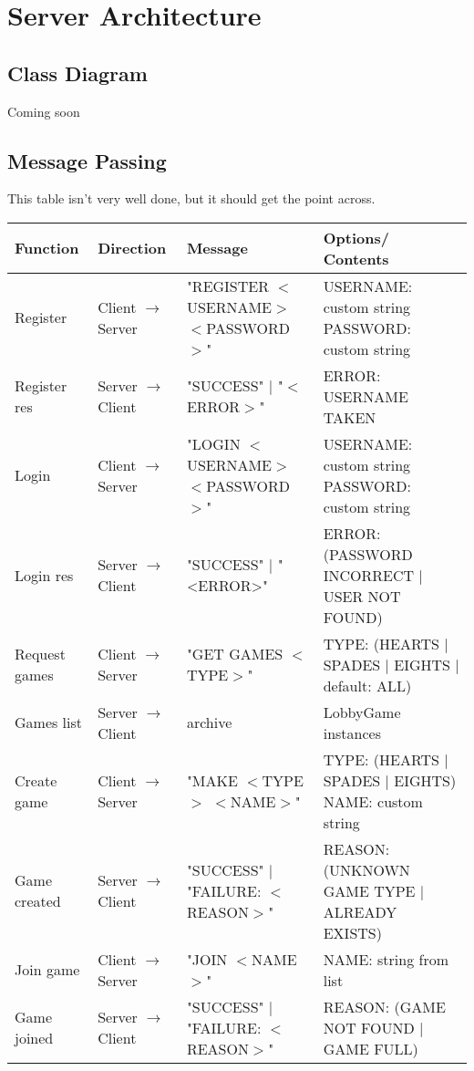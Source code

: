 \section{Server Architecture}
\subsection{Class Diagram}
Coming soon
\subsection{Message Passing}
This table isn't very well done, but it should get the point across.
\begin{center}
\begin{longtable}{|m{8em}|m{7em}|m{12em}|m{6em}|}
\hline
Function & Direction & Message & Options/ Contents \\
\hline\hline
Register & Client $\rightarrow$ Server & "REGISTER $<$USERNAME$>$ $<$PASSWORD$>$" & USERNAME: custom string PASSWORD: custom string\\
\hline
Register res & Server $\rightarrow$ Client & "SUCCESS" $|$ "$<$ERROR$>$" & ERROR: USERNAME TAKEN\\
\hline
Login & Client $\rightarrow$ Server & "LOGIN $<$USERNAME$>$ $<$PASSWORD$>$" & USERNAME: custom string PASSWORD: custom string\\
\hline
Login res & Server $\rightarrow$ Client & "SUCCESS" $|$ "<ERROR>" & ERROR: (PASSWORD INCORRECT $|$ USER NOT FOUND)\\
\hline
Request games & Client $\rightarrow$ Server & "GET GAMES $<$TYPE$>$" & TYPE: (HEARTS $|$ SPADES $|$ EIGHTS $|$ default: ALL)\\
\hline
Games list & Server $\rightarrow$ Client & archive & LobbyGame instances\\
\hline
Create game & Client $\rightarrow$ Server & "MAKE $<$TYPE$>$ $<$NAME$>$" & TYPE: (HEARTS $|$ SPADES $|$ EIGHTS) NAME: custom string\\
\hline
Game created & Server $\rightarrow$ Client & "SUCCESS" $|$ "FAILURE: $<$REASON$>$" & REASON: (UNKNOWN GAME TYPE $|$ ALREADY EXISTS)\\
\hline
Join game & Client $\rightarrow$ Server & "JOIN $<$NAME$>$" & NAME: string from list\\
\hline
Game joined & Server $\rightarrow$ Client & "SUCCESS" $|$ "FAILURE: $<$REASON$>$" & REASON: (GAME NOT FOUND $|$ GAME FULL)\\
\hline
\end{longtable}
\end{center}
